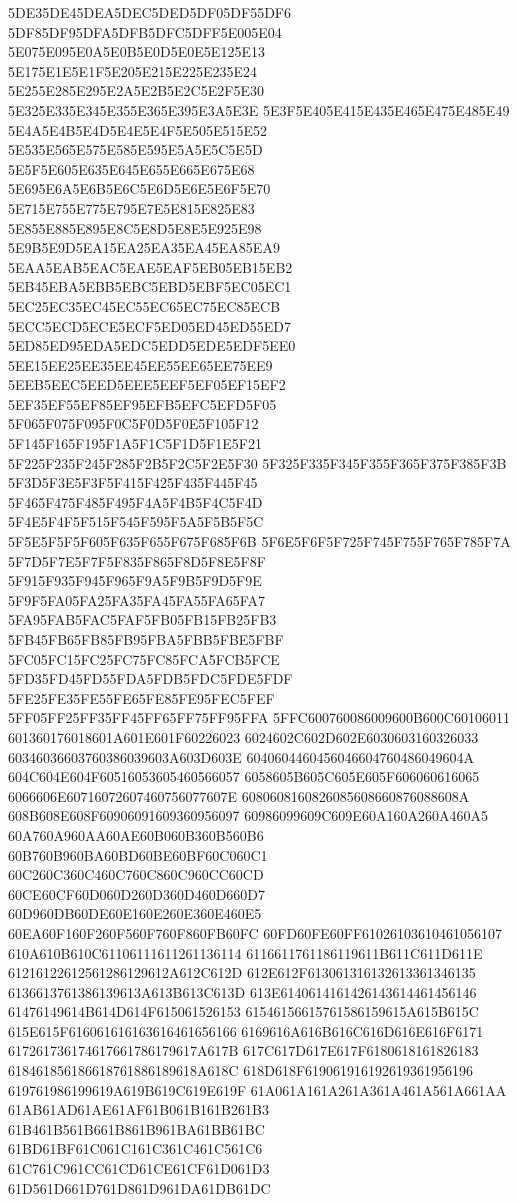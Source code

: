 5DE35DE45DEA5DEC5DED5DF05DF55DF6
5DF85DF95DFA5DFB5DFC5DFF5E005E04
5E075E095E0A5E0B5E0D5E0E5E125E13
5E175E1E5E1F5E205E215E225E235E24
5E255E285E295E2A5E2B5E2C5E2F5E30
5E325E335E345E355E365E395E3A5E3E
5E3F5E405E415E435E465E475E485E49
5E4A5E4B5E4D5E4E5E4F5E505E515E52
5E535E565E575E585E595E5A5E5C5E5D
5E5F5E605E635E645E655E665E675E68
5E695E6A5E6B5E6C5E6D5E6E5E6F5E70
5E715E755E775E795E7E5E815E825E83
5E855E885E895E8C5E8D5E8E5E925E98
5E9B5E9D5EA15EA25EA35EA45EA85EA9
5EAA5EAB5EAC5EAE5EAF5EB05EB15EB2
5EB45EBA5EBB5EBC5EBD5EBF5EC05EC1
5EC25EC35EC45EC55EC65EC75EC85ECB
5ECC5ECD5ECE5ECF5ED05ED45ED55ED7
5ED85ED95EDA5EDC5EDD5EDE5EDF5EE0
5EE15EE25EE35EE45EE55EE65EE75EE9
5EEB5EEC5EED5EEE5EEF5EF05EF15EF2
5EF35EF55EF85EF95EFB5EFC5EFD5F05
5F065F075F095F0C5F0D5F0E5F105F12
5F145F165F195F1A5F1C5F1D5F1E5F21
5F225F235F245F285F2B5F2C5F2E5F30
5F325F335F345F355F365F375F385F3B
5F3D5F3E5F3F5F415F425F435F445F45
5F465F475F485F495F4A5F4B5F4C5F4D
5F4E5F4F5F515F545F595F5A5F5B5F5C
5F5E5F5F5F605F635F655F675F685F6B
5F6E5F6F5F725F745F755F765F785F7A
5F7D5F7E5F7F5F835F865F8D5F8E5F8F
5F915F935F945F965F9A5F9B5F9D5F9E
5F9F5FA05FA25FA35FA45FA55FA65FA7
5FA95FAB5FAC5FAF5FB05FB15FB25FB3
5FB45FB65FB85FB95FBA5FBB5FBE5FBF
5FC05FC15FC25FC75FC85FCA5FCB5FCE
5FD35FD45FD55FDA5FDB5FDC5FDE5FDF
5FE25FE35FE55FE65FE85FE95FEC5FEF
5FF05FF25FF35FF45FF65FF75FF95FFA
5FFC600760086009600B600C60106011
601360176018601A601E601F60226023
6024602C602D602E6030603160326033
60346036603760386039603A603D603E
6040604460456046604760486049604A
604C604E604F60516053605460566057
6058605B605C605E605F606060616065
6066606E60716072607460756077607E
6080608160826085608660876088608A
608B608E608F60906091609360956097
60986099609C609E60A160A260A460A5
60A760A960AA60AE60B060B360B560B6
60B760B960BA60BD60BE60BF60C060C1
60C260C360C460C760C860C960CC60CD
60CE60CF60D060D260D360D460D660D7
60D960DB60DE60E160E260E360E460E5
60EA60F160F260F560F760F860FB60FC
60FD60FE60FF61026103610461056107
610A610B610C61106111611261136114
6116611761186119611B611C611D611E
61216122612561286129612A612C612D
612E612F613061316132613361346135
6136613761386139613A613B613C613D
613E6140614161426143614461456146
61476149614B614D614F615061526153
61546156615761586159615A615B615C
615E615F616061616163616461656166
6169616A616B616C616D616E616F6171
617261736174617661786179617A617B
617C617D617E617F6180618161826183
618461856186618761886189618A618C
618D618F619061916192619361956196
619761986199619A619B619C619E619F
61A061A161A261A361A461A561A661AA
61AB61AD61AE61AF61B061B161B261B3
61B461B561B661B861B961BA61BB61BC
61BD61BF61C061C161C361C461C561C6
61C761C961CC61CD61CE61CF61D061D3
61D561D661D761D861D961DA61DB61DC
